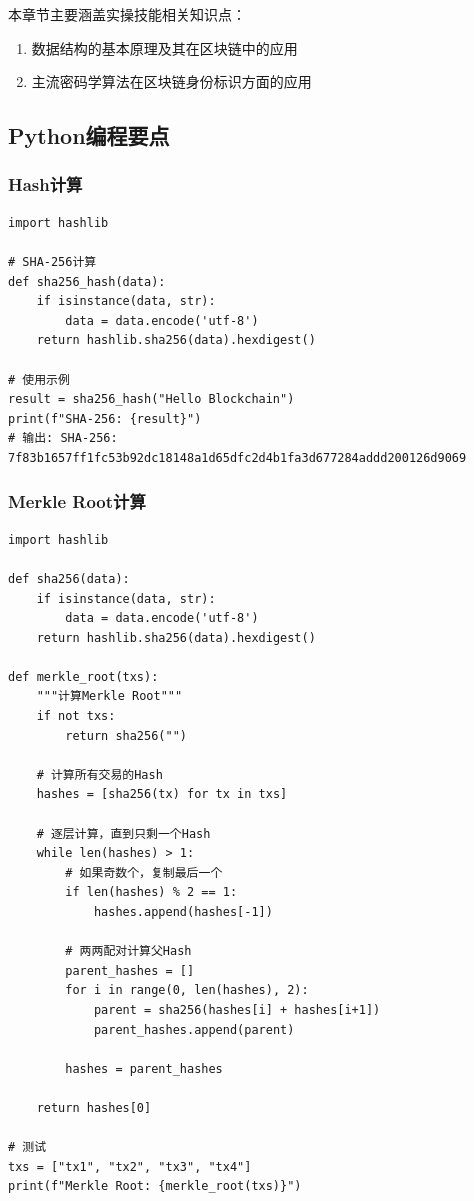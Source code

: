 ﻿\documentclass[12pt,a4paper]{article}
\begin{document}
本章节主要涵盖实操技能相关知识点：

\begin{enumerate}[leftmargin=1.5em]
    \item 数据结构的基本原理及其在区块链中的应用
    \item 主流密码学算法在区块链身份标识方面的应用
\end{enumerate}

\subsection{Python编程要点}

\subsubsection{Hash计算}

\begin{lstlisting}
import hashlib

# SHA-256计算
def sha256_hash(data):
    if isinstance(data, str):
        data = data.encode('utf-8')
    return hashlib.sha256(data).hexdigest()

# 使用示例
result = sha256_hash("Hello Blockchain")
print(f"SHA-256: {result}")
# 输出: SHA-256: 7f83b1657ff1fc53b92dc18148a1d65dfc2d4b1fa3d677284addd200126d9069
\end{lstlisting}

\subsubsection{Merkle Root计算}

\begin{lstlisting}
import hashlib

def sha256(data):
    if isinstance(data, str):
        data = data.encode('utf-8')
    return hashlib.sha256(data).hexdigest()

def merkle_root(txs):
    """计算Merkle Root"""
    if not txs:
        return sha256("")
    
    # 计算所有交易的Hash
    hashes = [sha256(tx) for tx in txs]
    
    # 逐层计算，直到只剩一个Hash
    while len(hashes) > 1:
        # 如果奇数个，复制最后一个
        if len(hashes) % 2 == 1:
            hashes.append(hashes[-1])
        
        # 两两配对计算父Hash
        parent_hashes = []
        for i in range(0, len(hashes), 2):
            parent = sha256(hashes[i] + hashes[i+1])
            parent_hashes.append(parent)
        
        hashes = parent_hashes
    
    return hashes[0]

# 测试
txs = ["tx1", "tx2", "tx3", "tx4"]
print(f"Merkle Root: {merkle_root(txs)}")
\end{lstlisting}
\end{document}
